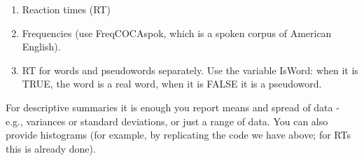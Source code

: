 \documentclass[
]{article}
\providecommand{\tightlist}{%
  \setlength{\itemsep}{0pt}\setlength{\parskip}{0pt}}
\begin{document}
\begin{enumerate}
\def\labelenumi{\arabic{enumi}.}
\tightlist
\item
  Reaction times (RT)
\item
  Frequencies (use FreqCOCAspok, which is a spoken corpus of American
  English).
\item
  RT for words and pseudowords separately. Use the variable IsWord: when
  it is TRUE, the word is a real word, when it is FALSE it is a
  pseudoword.
\end{enumerate}

For descriptive summaries it is enough you report means and spread of
data - e.g., variances or standard deviations, or just a range of data.
You can also provide histograms (for example, by replicating the code we
have above; for RTs this is already done).
\end{document}
